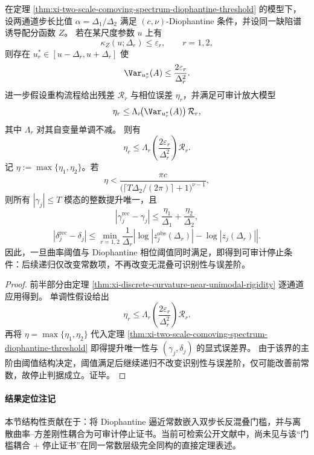 \begin{theorem}[二尺度反混叠与离散曲率刚性的全链路停止证书]\label{thm:xi-two-scale-unaliasing-discrete-curvature-stop-certificate}
在定理 \ref{thm:xi-two-scale-comoving-spectrum-diophantine-threshold} 的模型下，设两通道步长比值 \(\alpha=\Delta_1/\Delta_2\) 满足 \((c,\nu)\)-Diophantine 条件，并设同一缺陷谱诱导配分函数 \(Z\)。
若在某尺度参数 \(u\) 上有
\[
\kappa_Z(u;\Delta_r)\le\varepsilon_r,\qquad r=1,2,
\]
则存在 \(u_r^\ast\in[u-\Delta_r,u+\Delta_r]\) 使
\[
\Var_{u_r^\ast}(A)\le\frac{2\varepsilon_r}{\Delta_r^2}.
\]
进一步假设重构流程给出残差 \(\mathcal R_r\) 与相位误差 \(\eta_r\)，并满足可审计放大模型
\[
\eta_r\le \Lambda_r\!\bigl(\Var_{u_r^\ast}(A)\bigr)\,\mathcal R_r,
\]
其中 \(\Lambda_r\) 对其自变量单调不减。
则有
\[
\eta_r\le
\Lambda_r\!\left(\frac{2\varepsilon_r}{\Delta_r^2}\right)\mathcal R_r.
\]
记 \(\eta:=\max\{\eta_1,\eta_2\}\)。若
\[
\eta<
\frac{\pi c}{
\bigl(\lceil T\Delta_2/(2\pi)\rceil+1\bigr)^{\nu-1}
},
\]
则所有 \(|\gamma_j|\le T\) 模态的整数提升唯一，且
\[
|\gamma_j^{\mathrm{rec}}-\gamma_j|
\le
\frac{\eta_1}{\Delta_1}+\frac{\eta_2}{\Delta_2},
\]
\[
|\delta_j^{\mathrm{rec}}-\delta_j|
\le
\min_{r=1,2}
\frac{1}{\Delta_r}
\left|
\log|z_j^{\mathrm{obs}}(\Delta_r)|-\log|z_j(\Delta_r)|
\right|.
\]
因此，一旦曲率阈值与 Diophantine 相位阈值同时满足，即得到可审计停止条件：后续递归仅改变常数项，不再改变无混叠可识别性与误差阶。
\end{theorem}
\begin{proof}
前半部分由定理 \ref{thm:xi-discrete-curvature-near-unimodal-rigidity} 逐通道应用得到。
单调性假设给出
\[
\eta_r\le
\Lambda_r\!\left(\frac{2\varepsilon_r}{\Delta_r^2}\right)\mathcal R_r.
\]
再将 \(\eta=\max\{\eta_1,\eta_2\}\) 代入定理 \ref{thm:xi-two-scale-comoving-spectrum-diophantine-threshold} 即得提升唯一性与 \((\gamma_j,\delta_j)\) 的显式误差界。
由于该界的主阶由阈值结构决定，阈值满足后继续递归不改变识别性与误差阶，仅可能改善前常数，故停止判据成立。证毕。
\end{proof}

\paragraph{结果定位注记}
本节结构性贡献在于：将 Diophantine 逼近常数嵌入双步长反混叠门槛，并与离散曲率--方差刚性耦合为可审计停止证书。当前可检索公开文献中，尚未见与该“门槛耦合 + 停止证书”在同一常数层级完全同构的直接定理表述。

\endinput
